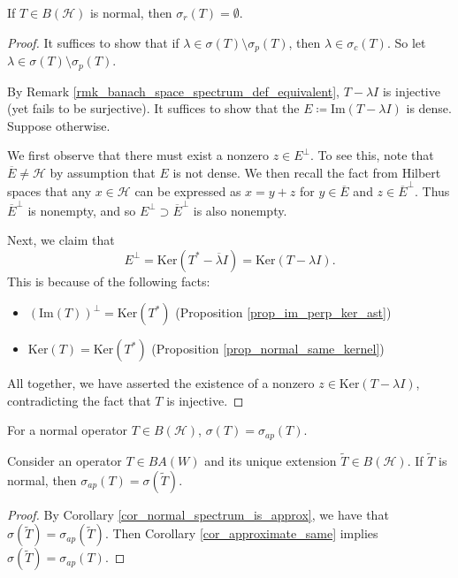 \documentclass[12pt]{article}
\begin{document}
\begin{proposition}
\label{prop_normal_residual_empty}
	If $T\in B(\mathcal{H})$ is normal, then $\sigma_r(T)=\emptyset$.
\end{proposition}
\begin{proof}
	It suffices to show that if $\lambda\in \sigma(T)\setminus\sigma_p(T)$, then $\lambda\in\sigma_c(T)$. So let $\lambda\in \sigma(T)\setminus\sigma_p(T)$.

	By Remark \ref{rmk_banach_space_spectrum_def_equivalent}, $T-\lambda I$ is injective (yet fails to be surjective). It suffices to show that the $E\coloneqq \text{Im}(T-\lambda I)$ is dense. Suppose otherwise. 

	We first observe that there must exist a nonzero $z\in E^\perp$. To see this, note that $\overline{E}\neq \mathcal{H}$ by assumption that $E$ is not dense. We then recall the fact from Hilbert spaces that any $x\in\mathcal{H}$ can be expressed as $x=y+z$ for $y\in \overline{E}$ and $z\in \overline{E}^\perp$. Thus $\overline{E}^\perp$ is nonempty, and so $E^\perp \supset \overline{E}^\perp$ is also nonempty.

	Next, we claim that
	\begin{equation*}
		E^\perp = \text{Ker}(T^\ast - \overline{\lambda}I)= \text{Ker}(T-\lambda I).
	\end{equation*}
	This is because of the following facts:
	\begin{itemize}
		\item $(\text{Im}(T))^\perp = \text{Ker}(T^\ast)$ (Proposition \ref{prop_im_perp_ker_ast})
		\item $\text{Ker}(T)=\text{Ker}(T^\ast)$ (Proposition \ref{prop_normal_same_kernel})
	\end{itemize}

	All together, we have asserted the existence of a nonzero $z\in\text{Ker}(T-\lambda I)$, contradicting the fact that $T$ is injective.
\end{proof}

\begin{corollary}
\label{cor_normal_spectrum_is_approx}
	For a normal operator $T\in B(\mathcal{H})$, $\sigma(T)=\sigma_{ap}(T)$.
\end{corollary}

\begin{corollary}
	Consider an operator $T\in BA(W)$ and its unique extension $\tilde{T}\in B(\mathcal{H})$. If $\tilde{T}$ is normal, then $\sigma_{ap}(T)=\sigma(\tilde{T})$.
\end{corollary}
\begin{proof}
	By Corollary \ref{cor_normal_spectrum_is_approx}, we have that $\sigma(\tilde{T})=\sigma_{ap}(\tilde{T})$. Then Corollary \ref{cor_approximate_same} implies $\sigma(\tilde{T}) = \sigma_{ap}(T)$.
\end{proof}
\end{document}
